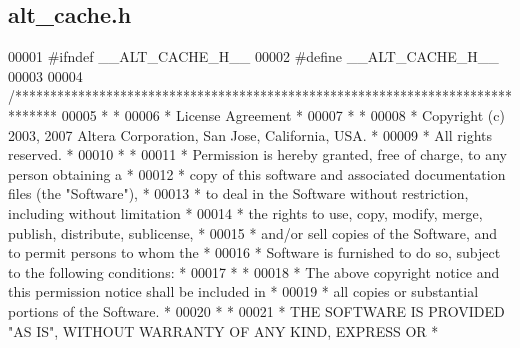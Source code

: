 \subsection{alt\+\_\+cache.\+h}
\label{alt__cache_8h_source}

\begin{DoxyCode}
00001 \textcolor{preprocessor}{#ifndef \_\_ALT\_CACHE\_H\_\_}
00002 \textcolor{preprocessor}{#define \_\_ALT\_CACHE\_H\_\_}
00003 
00004 \textcolor{comment}{/******************************************************************************}
00005 \textcolor{comment}{*                                                                             *}
00006 \textcolor{comment}{* License Agreement                                                           *}
00007 \textcolor{comment}{*                                                                             *}
00008 \textcolor{comment}{* Copyright (c) 2003, 2007 Altera Corporation, San Jose, California, USA.     *}
00009 \textcolor{comment}{* All rights reserved.                                                        *}
00010 \textcolor{comment}{*                                                                             *}
00011 \textcolor{comment}{* Permission is hereby granted, free of charge, to any person obtaining a     *}
00012 \textcolor{comment}{* copy of this software and associated documentation files (the "Software"),  *}
00013 \textcolor{comment}{* to deal in the Software without restriction, including without limitation   *}
00014 \textcolor{comment}{* the rights to use, copy, modify, merge, publish, distribute, sublicense,    *}
00015 \textcolor{comment}{* and/or sell copies of the Software, and to permit persons to whom the       *}
00016 \textcolor{comment}{* Software is furnished to do so, subject to the following conditions:        *}
00017 \textcolor{comment}{*                                                                             *}
00018 \textcolor{comment}{* The above copyright notice and this permission notice shall be included in  *}
00019 \textcolor{comment}{* all copies or substantial portions of the Software.                         *}
00020 \textcolor{comment}{*                                                                             *}
00021 \textcolor{comment}{* THE SOFTWARE IS PROVIDED "AS IS", WITHOUT WARRANTY OF ANY KIND, EXPRESS OR  *}

\end{DoxyCode}
